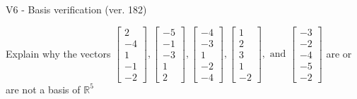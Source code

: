 \begin{exercise}
  \begin{exerciseTitle}V6 - Basis verification (ver. 182)\end{exerciseTitle}
  \begin{exerciseStatement}
    Explain why the vectors \(\left[\begin{array}{r}
2 \\
-4 \\
1 \\
-1 \\
-2
\end{array}\right] , \left[\begin{array}{r}
-5 \\
-1 \\
-3 \\
1 \\
2
\end{array}\right] , \left[\begin{array}{r}
-4 \\
-3 \\
1 \\
-2 \\
-4
\end{array}\right] , \left[\begin{array}{r}
1 \\
2 \\
3 \\
1 \\
-2
\end{array}\right] , \text{ and } \left[\begin{array}{r}
-3 \\
-2 \\
-4 \\
-5 \\
-2
\end{array}\right]\) are or are not a basis of \(\mathbb{R}^5\)	



\end{exerciseStatement}
\end{exercise}

